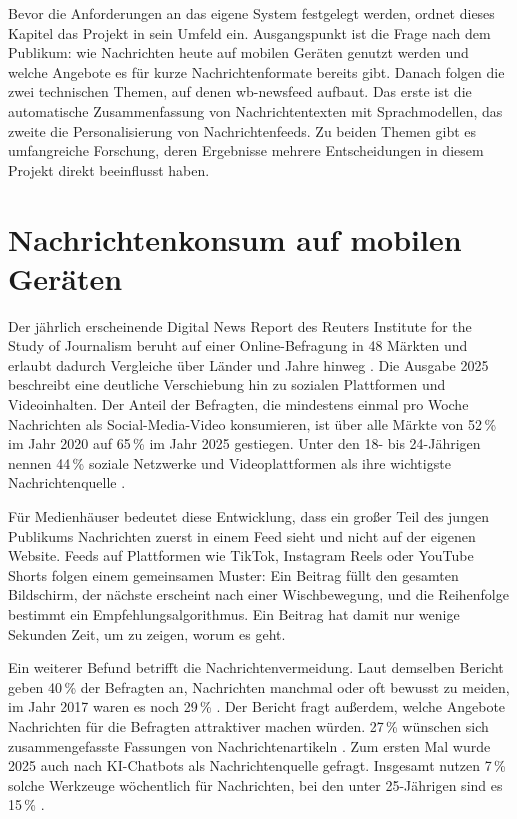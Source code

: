 Bevor die Anforderungen an das eigene System festgelegt werden, ordnet dieses Kapitel das Projekt in sein Umfeld ein.\kihinweis{}
Ausgangspunkt ist die Frage nach dem Publikum: wie Nachrichten heute auf mobilen Geräten genutzt werden und welche Angebote es für kurze Nachrichtenformate bereits gibt.
Danach folgen die zwei technischen Themen, auf denen wb-newsfeed aufbaut.
Das erste ist die automatische Zusammenfassung von Nachrichtentexten mit Sprachmodellen, das zweite die Personalisierung von Nachrichtenfeeds.
Zu beiden Themen gibt es umfangreiche Forschung, deren Ergebnisse mehrere Entscheidungen in diesem Projekt direkt beeinflusst haben.

\section{Nachrichtenkonsum auf mobilen Geräten}
\setauthor{\secondauthor}

Der jährlich erscheinende Digital News Report des Reuters Institute for the Study of Journalism beruht auf einer Online-Befragung in 48 Märkten und erlaubt dadurch Vergleiche über Länder und Jahre hinweg \cite{newman2025dnr}.
Die Ausgabe 2025 beschreibt eine deutliche Verschiebung hin zu sozialen Plattformen und Videoinhalten.
Der Anteil der Befragten, die mindestens einmal pro Woche Nachrichten als Social-Media-Video konsumieren, ist über alle Märkte von 52\,\% im Jahr 2020 auf 65\,\% im Jahr 2025 gestiegen.
Unter den 18- bis 24-Jährigen nennen 44\,\% soziale Netzwerke und Videoplattformen als ihre wichtigste Nachrichtenquelle \cite{newman2025dnr}.

Für Medienhäuser bedeutet diese Entwicklung, dass ein großer Teil des jungen Publikums Nachrichten zuerst in einem Feed sieht und nicht auf der eigenen Website.
Feeds auf Plattformen wie TikTok, Instagram Reels oder YouTube Shorts folgen einem gemeinsamen Muster: Ein Beitrag füllt den gesamten Bildschirm, der nächste erscheint nach einer Wischbewegung, und die Reihenfolge bestimmt ein Empfehlungsalgorithmus.
Ein Beitrag hat damit nur wenige Sekunden Zeit, um zu zeigen, worum es geht.

Ein weiterer Befund betrifft die Nachrichtenvermeidung.
Laut demselben Bericht geben 40\,\% der Befragten an, Nachrichten manchmal oder oft bewusst zu meiden, im Jahr 2017 waren es noch 29\,\% \cite{newman2025dnr}.
Der Bericht fragt außerdem, welche Angebote Nachrichten für die Befragten attraktiver machen würden.
27\,\% wünschen sich zusammengefasste Fassungen von Nachrichtenartikeln \cite{newman2025dnr}.
Zum ersten Mal wurde 2025 auch nach KI-Chatbots als Nachrichtenquelle gefragt.
Insgesamt nutzen 7\,\% solche Werkzeuge wöchentlich für Nachrichten, bei den unter 25-Jährigen sind es 15\,\% \cite{newman2025dnr}.

